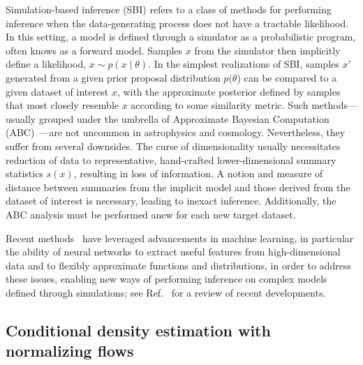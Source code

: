 \documentclass[prd,aps,10pt,nofootinbib,twocolumn,superscriptaddress,preprintnumbers,balancelastpage,longbibliography]{revtex4-1}
\begin{document}
Simulation-based inference (SBI) refers to a class of methods for performing inference when the data-generating process does not have a tractable likelihood. In this setting, a model is defined through a simulator as a probabilistic program, often knows as a forward model. Samples $x$ from the simulator then implicitly define a likelihood, $x\sim p(x\mid\theta)$. In the simplest realizations of SBI, samples $x'$ generated from a given prior proposal distribution $p(\theta$) can be compared to a given dataset of interest $x$, with the approximate posterior defined by samples that most closely resemble $x$ according to some similarity metric. Such methods---usually grouped under the umbrella of Approximate Bayesian Computation (ABC)~\cite{10.1214/aos/1176346785}---are not uncommon in astrophysics and cosmology. Nevertheless, they suffer from several downsides. The curse of dimensionality usually necessitates reduction of data to representative, hand-crafted lower-dimensional summary statistics $s(x)$, resulting in loss of information. A notion and measure of distance between summaries from the implicit model and those derived from the dataset of interest is necessary, leading to inexact inference. Additionally, the ABC analysis must be performed anew for each new target dataset.

Recent methods~\cite{Alsing:2019xrx,Brehmer:2018eca,Brehmer:2018hga,Brehmer:2018kdj,Brehmer:2020cvb,Cranmer:2015bka,cranmerFrontierSimulationbasedInference2020,durkanContrastiveLearningLikelihoodfree2020,greenbergAutomaticPosteriorTransformation2019,Hermans:2019ioj,lueckmannBenchmarkingSimulationBasedInference2021,lueckmannLikelihoodfreeInferenceEmulator2019,pacchiardiGeneralizedBayesianLikelihoodFree2021,papamakariosFastEpsilonFree2018,papamakariosSequentialNeuralLikelihood2019,wiqvistSequentialNeuralPosterior2021,zhaoValidatingConditionalDensity2021} have leveraged advancements in machine learning, in particular the ability of neural networks to extract useful features from high-dimensional data and to flexibly approximate functions and distributions, in order to address these issues, enabling new ways of performing inference on complex models defined through simulations; see Ref.~\cite{cranmer2020frontier} for a review of recent developments.

\subsection{Conditional density estimation with normalizing flows}
\end{document}
